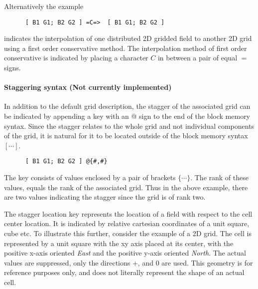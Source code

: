 Alternatively the example 
\begin{center}
\begin{verbatim}
      [ B1 G1; B2 G2 ] =C=>  [ B1 G1; B2 G2 ]
\end{verbatim}
\end{center}
indicates the interpolation of one distributed 2D gridded field to another 2D grid using a first order conservative method. The interpolation method of first order conservative is indicated by placing a character $C$ in between a pair of equal $=$ signs. 

\paragraph{Staggering syntax (Not currently implemented)}
In addition to the default grid description, the stagger of the associated grid
can be indicated by appending a key with an @ sign to the end of the block memory syntax. Since the stagger relates to the whole grid and not individual components of the grid, it is natural for it to be located outside of the block memory syntax $[ \cdots ]$.
\begin{center}
\begin{verbatim}
      [ B1 G1; B2 G2 ] @{#,#}
\end{verbatim}
\end{center}
The key consists of values enclosed by a pair of brackets $\{ \cdots \}$. The rank of these values, equals the rank of the associated grid. Thus in the above example, there are two values indicating the stagger since the grid is of rank two. 

The stagger location key represents the location of a field with respect to the cell center location. It is indicated by relative cartesian coordinates of a unit square, cube etc. To illustrate this further, consider the example of a 2D grid. The cell is represented by a unit square with the xy axis placed at its center, with the positive x-axis oriented {\em East} and the positive y-axis oriented {\em North}. The actual values are suppressed, only the directions $+$, and $0$ are used. This geometry is for reference purposes only, and does not literally represent the shape of an actual cell. 


